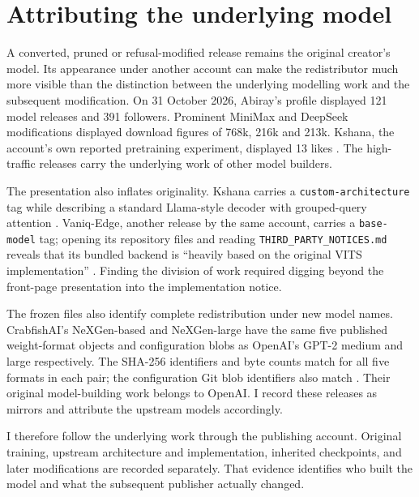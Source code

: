 \section{Attributing the underlying model}
A converted, pruned or refusal-modified release remains the original creator's
model. Its appearance under another account can make the redistributor much
more visible than the distinction between the underlying modelling work and
the subsequent modification. On 31 October 2026, Abiray's profile displayed
121 model releases and 391 followers. Prominent MiniMax and DeepSeek
modifications displayed download figures of 768k, 216k and 213k. Kshana, the
account's own reported pretraining experiment, displayed 13 likes
\cite{abirayprofile,kshanacard}.
The high-traffic releases carry the underlying work of other model builders.

The presentation also inflates originality. Kshana carries a
\texttt{custom-architecture} tag while describing a standard Llama-style
decoder with grouped-query attention \cite{kshanacard}. Vaniq-Edge, another
release by the same account, carries a \texttt{base-model} tag; opening its
repository files and reading \texttt{THIRD\_PARTY\_NOTICES.md} reveals that its
bundled backend is ``heavily based on the original VITS implementation''
\cite{vaniqcard,vaniqnotices}. Finding the division of work required digging
beyond the front-page presentation into the implementation notice.

The frozen files also identify complete redistribution under new model
names. CrabfishAI's NeXGen-based and NeXGen-large have the same five published
weight-format objects and configuration blobs as OpenAI's GPT-2 medium and
large respectively. The SHA-256 identifiers and byte counts match for all
five formats in each pair; the configuration Git blob identifiers also
match \cite{nexgenmedium,nexgenlarge,provenancecomparisons}. Their original
model-building work belongs to OpenAI. I record these releases as mirrors
and attribute the upstream models accordingly.

I therefore follow the underlying work through the publishing account.
Original training, upstream architecture and implementation,
inherited checkpoints, and later modifications are recorded separately.
That evidence identifies who built the model and what the subsequent
publisher actually changed.
